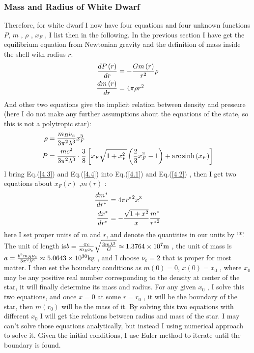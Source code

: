 \documentclass[reprint]{revtex4-1}
\begin{document}
\subsubsection{Mass and Radius of White Dwarf}
Therefore, for white dwarf I now have four equations and four unknown functions $P$, $m$ , $\rho$ , $x_F$ , I list then in the following.  In the previous section I have get the equilibrium equation from Newtonian gravity and the definition of mass inside the shell with radius $r$:
\begin{align}
{{dP\left( r \right)} \over {dr}} &=  - {{Gm\left( r \right)} \over {{r^2}}}\rho \label{4.1}\\
{{dm\left( r \right)} \over {dr}} &= 4\pi \rho {r^2} \label{4.2}
\end{align}
And other two equations give the implicit relation between density and pressure (here I do not make any further assumptions about the equations of the state, so this is not a polytropic star):
\begin{align}
\rho  &= {{{m_B}{\nu _e}} \over {3{\pi ^2}{\lambda ^3}}}x_F^3 \label{4.3}\\
P &= {{m{c^2}} \over {3{\pi ^2}{\lambda ^3}}} \cdot {3 \over 8}\left[ {{x_F}\sqrt {1 + x_F^2} \left( {{2 \over 3}x_F^2 - 1} \right) + {\mathop{\rm arc}\nolimits} \sinh \left( {{x_F}} \right)} \right] \label{4.4}
\end{align}
I bring Eq.(\ref{4.3}) and Eq.(\ref{4.4}) into Eq.(\ref{4.1}) and Eq.(\ref{4.2}) ,  then I get two equations about $x_F(r)$ ,$m(r)$ :
\begin{align}
{{d{m^*}} \over {d{r^*}}} &= 4\pi {r^*}^2{x^3} \label{4.5}\\
{{d{x^*}} \over {d{r^*}}} &=  - {{\sqrt {1 + {x^2}} } \over x}{{{m^*}} \over {{r^*}^2}} \label{4.6}
\end{align}
here I set proper units of $m$  and $r$, and denote the quantities in our units by ‘*’. The unit of length is$b = {{\pi c} \over {{m_B}{\nu _e}}}\sqrt {{{3m{\lambda ^3}} \over G}}  \approx 1.3764 \times {10^7}{\mathop{\rm m}\nolimits} $ , the unit of mass is $a = {{{b^3}{m_B}{\nu _e}} \over {3{\pi ^2}{\lambda ^3}}} \approx 5.0643 \times {10^{30}}{\mathop{\rm kg}\nolimits} $ , and I choose $\nu_e=2$ that is proper for most matter. I then set the boundary conditions as $m\left( 0 \right) = 0$, $x\left( 0 \right) = {x_0}$ , where $x_0$ may be any positive real number corresponding to the density at center of the star, it will finally determine its mass and radius. For any given $x_0$ , I solve this two equations, and once $x = 0$ at some $r = {r_0}$ , it will be the boundary of the star, then $m(r_0)$ will be the mass of it. By solving this two equations with different $x_0$ I will get the relations between radius and mass of the star. I may can’t solve those equations analytically, but instead I using numerical approach to solve it. Given the initial conditions, I use Euler method to iterate until the boundary is found. \par
\end{document}
